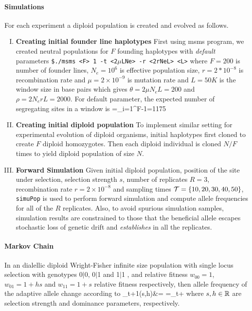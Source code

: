 \documentclass[11pt]{article}
\begin{document}
\paragraph{Simulations}
For each experiment a diploid population is created and evolved as 
follows. 
\begin{enumerate}[I.]
	\item {\bf Creating initial founder line haplotypes}
	First using msms program, we created neutral populations for $F$ 
	founding 
	haplotypes with \emph{default} parameters \texttt{\$./msms <F> 1 
	-t 
		<2$\mu$LNe> 
		-r <2rNeL> 
		<L>} 
	where $F=200$ is number of founder lines, $N_e=10^6$ is 
	effective 
	population size, $r=2*10^{-8}$ is recombination rate and 
	$\mu=2\times 
	10^{-9}$ is mutation rate and  $L=50K$ is the window size in 
	base pairs 
	which gives $\theta=2\mu N_eL=200$ and $\rho=2N_erL=2000$. 
	For 
	default 
	parameter, the expected number of segregating sites in a window 
	is 
	\beqq
	\Ebb[M]=\theta \sum_{i=1}^{F-1}=1175
	\eeqq
	\item{\bf Creating initial diploid population} 
	To implement similar setting for experimental evolution of diploid 
	organisms, 
	initial  haplotypes first cloned to create $F$ diploid homozygotes. 
	Then 
	each 
	diploid individual is  cloned $N/F$ times to yield diploid 
	population of 
	size 
	$N$.
	\item{\bf Forward Simulation}
	Given initial diploid population, position of the site under 
	selection, 
	selection 
	strength $s$, number of replicates $R=3$, recombination rate 
	$r=2\times10^{-8}$ 
	and sampling times ${\cal T}=\{10,20,30,40,50\}$, \texttt{simuPop} is 
	used to 
	perform
	forward simulation and  compute allele frequencies for all of the 
	$R$ 
	replicates. Also, to avoid spurious simulation samples, simulation 
	results 
	are constrained to those that the beneficial allele escapes 
	stochastic loss 
	of genetic drift and \emph{establishes} in all the replicates. 
\end{enumerate}


\paragraph{Markov Chain}\label{sec:comale}
In an dialellic diploid Wright-Fisher infinite size population with single locus selection with genotypes 0$|$0, 0$|$1 and 1$|$1 , and relative fitness $w_{00}=1$, $w_{01}=1+hs$ and  $w_{11}=1+s$ relative fitness respectively, then allele frequency of the adaptive allele change according to
\beq
\nu_{t+1}(s,h)&= =\nu_t+
\label{eq:markovs}
\eeq
where $s,h\in {\mathbb R}$ are selection strength and dominance parameters, respectively. 
\end{document}
